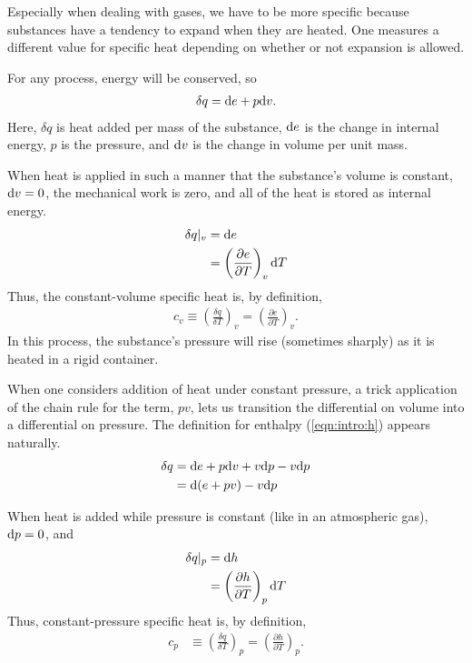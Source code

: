 Especially when dealing with gases, we have to be more specific because substances have a tendency to expand when they are heated.  One measures a different value for specific heat depending on whether or not expansion is allowed. 

For any process, energy will be conserved, so
\begin{align}
\delta q = \mathrm{d} e + p\mathrm{d} v.\label{eqn:intro:1stlaw}
\end{align}
Here, $\delta q$ is heat added per mass of the substance, $\mathrm{d} e$ is the change in internal energy, $p$ is the pressure, and $\mathrm{d} v$ is the change in volume per unit mass.

When heat is applied in such a manner that the substance's volume is constant, $\mathrm{d} v = 0$, the mechanical work is zero, and all of the heat is stored as internal energy.
\begin{align}
\delta q |_v &= \mathrm{d} e\nonumber\\
 &= \left(\frac{\partial e}{\partial T}\right)_v \mathrm{d} T
\end{align}
Thus, the constant-volume specific heat is, by definition, 
\begin{align}
c_v \equiv \left(\frac{\delta q}{\delta T}\right)_v = \left(\frac{\partial e}{\partial T}\right)_v.\label{eqn:intro:cv}
\end{align}
In this process, the substance's pressure will rise (sometimes sharply) as it is heated in a rigid container.

When one considers addition of heat under constant pressure, a trick application of the chain rule for the term, $pv$, lets us transition the differential on volume into a differential on pressure.  The definition for enthalpy (\ref{eqn:intro:h}) appears naturally.
\begin{align}
\delta q &= \mathrm{d} e + p \mathrm{d} v + v\mathrm{d} p - v \mathrm{d} p\nonumber\\
 &= \mathrm{d}(e + pv) - v\mathrm{d} p
\end{align}

When heat is added while pressure is constant (like in an atmospheric gas), $\mathrm{d} p=0$, and 
\begin{align}
\delta q |_p &= \mathrm{d} h\nonumber\\
 &= \left( \frac{\partial h}{\partial T}\right)_p \mathrm{d} T
\end{align}
Thus, constant-pressure specific heat is, by definition,
\begin{align}
c_p &\equiv \left(\frac{\delta q}{\delta T}\right)_p = \left( \frac{\partial h}{\partial T}\right)_p.\label{eqn:intro:cp}
\end{align}



%
% 
%
